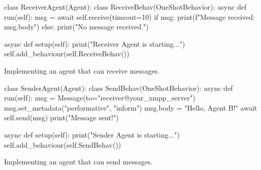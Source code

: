 \begin{frame}{\insertsection}
\end{frame}

\begin{frame}[fragile]{\insertsection}
    \begin{listing}
        \begin{mintedPython}
    class ReceiverAgent(Agent):
        class ReceiveBehav(OneShotBehavior):
            async def run(self):
                msg = await self.receive(timeout=10)
                if msg:
                    print(f"Message received: {msg.body}")
                else:
                    print("No message received.")
    
    async def setup(self):
        print("Receiver Agent is starting...")
        self.add_behaviour(self.ReceiveBehav())
        \end{mintedPython}
        \caption{Implementing an agent that can receive messages.}
    \end{listing}
\end{frame}


\begin{frame}[fragile]{\insertsection}
    \begin{listing}
        \begin{mintedPython}
class SenderAgent(Agent):
    class SendBehav(OneShotBehavior):
        async def run(self):
            msg = Message(to="receiver@your_xmpp_server")
            msg.set_metadata("performative", "inform")
            msg.body = "Hello, Agent B!"
            await self.send(msg)
            print("Message sent!")

    async def setup(self):
        print("Sender Agent is starting...")
        self.add_behaviour(self.SendBehav())
        \end{mintedPython}
        \caption{Implementing an agent that can send messages.}
    \end{listing}
\end{frame}
